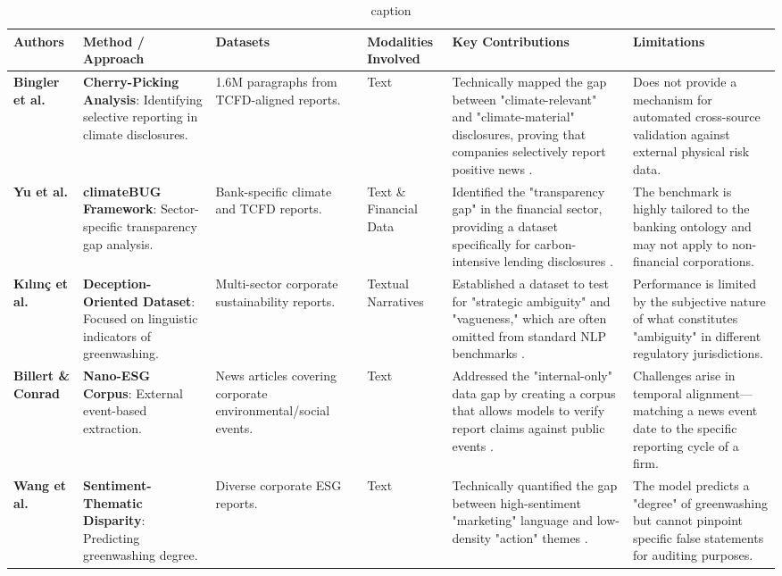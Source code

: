 \begin{landscape}
\begin{table}[p]
\centering
\caption{caption}
\label{label}
\small
\renewcommand{\arraystretch}{1.2}
\begin{tabularx}{\linewidth}{|p{1.8cm}|X|X|p{1.8cm}|X|X|}
\hline
Authors & Method / Approach & Datasets & Modalities Involved & Key Contributions & Limitations \\ \hline
\textbf{Bingler et al.}  \parencite{julia_bingler_268445e3} & \textbf{Cherry-Picking Analysis}: Identifying selective reporting in climate disclosures. & 1.6M paragraphs from TCFD-aligned reports. & Text & Technically mapped the gap between "climate-relevant" and "climate-material" disclosures, proving that companies selectively report positive news  \parencite{julia_bingler_268445e3}. & Does not provide a mechanism for automated cross-source validation against external physical risk data. \\ \hline
\textbf{Yu et al.}  \parencite{yinan_yu_e282fd98} & \textbf{climateBUG Framework}: Sector-specific transparency gap analysis. & Bank-specific climate and TCFD reports. & Text \& Financial Data & Identified the "transparency gap" in the financial sector, providing a dataset specifically for carbon-intensive lending disclosures  \parencite{yinan_yu_e282fd98}. & The benchmark is highly tailored to the banking ontology and may not apply to non-financial corporations. \\ \hline
\textbf{Kılınç et al.}  \parencite{yavuz_k_l_n__64e32f80} & \textbf{Deception-Oriented Dataset}: Focused on linguistic indicators of greenwashing. & Multi-sector corporate sustainability reports. & Textual Narratives & Established a dataset to test for "strategic ambiguity" and "vagueness," which are often omitted from standard NLP benchmarks  \parencite{yavuz_k_l_n__64e32f80}. & Performance is limited by the subjective nature of what constitutes "ambiguity" in different regulatory jurisdictions. \\ \hline
\textbf{Billert \& Conrad}  \parencite{fabian_billert_a5fbb687} & \textbf{Nano-ESG Corpus}: External event-based extraction. & News articles covering corporate environmental/social events. & Text & Addressed the "internal-only" data gap by creating a corpus that allows models to verify report claims against public events  \parencite{fabian_billert_a5fbb687}. & Challenges arise in temporal alignment—matching a news event date to the specific reporting cycle of a firm. \\ \hline
\textbf{Wang et al.}  \parencite{xiaojia_wang_02351a60} & \textbf{Sentiment-Thematic Disparity}: Predicting greenwashing degree. & Diverse corporate ESG reports. & Text & Technically quantified the gap between high-sentiment "marketing" language and low-density "action" themes  \parencite{xiaojia_wang_02351a60}. & The model predicts a "degree" of greenwashing but cannot pinpoint specific false statements for auditing purposes. \\ \hline

\end{tabularx}
\end{table}
\end{landscape}
